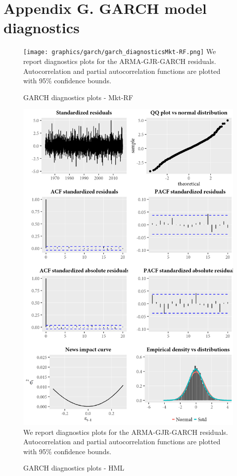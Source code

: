 \section{Appendix G. GARCH model diagnostics}
\label{App:AppendixG}
\begin{figure}[H]
  \caption{GARCH diagnostics plots - Mkt-RF}
  \label{diag:garchdiagMkt-RF}
  \centering
  \begin{minipage}{\textwidth}
  \texttt{[image: graphics/garch/garch\_diagnosticsMkt-RF.png]}  
  \vspace{3mm}
  \footnotesize
  We report diagnostics plots for the ARMA-GJR-GARCH residuals. Autocorrelation and partial autocorrelation functions are plotted with 95\% confidence bounds.
  \end{minipage}
\end{figure}
\begin{figure}[H]
  \caption{GARCH diagnostics plots - HML}
  \label{diag:garchdiagHML}
  \centering
  \begin{minipage}{\textwidth}
  \includegraphics[scale=1]{graphics/garch/garch_diagnosticsHML.png}  
  \vspace{3mm}
  \footnotesize
  We report diagnostics plots for the ARMA-GJR-GARCH residuals. Autocorrelation and partial autocorrelation functions are plotted with 95\% confidence bounds.
  \end{minipage}
\end{figure}

